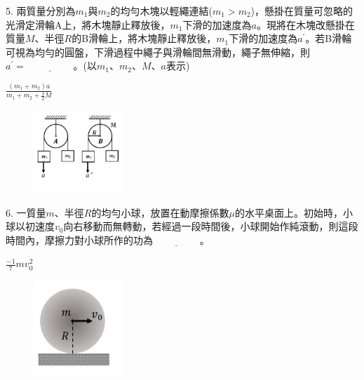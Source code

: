 \documentclass[cn,10pt,math=newtx]{elegantbook}
\begin{document}
\begin{example}
   5. 兩質量分別為$m_1與m_2$的均勻木塊以輕繩連結($m_1>m_2$)，懸掛在質量可忽略的光滑定滑輪A上，將木塊靜止釋放後，$m_1$下滑的加速度為$a$。現將在木塊改懸掛在質量$M$、半徑$R$的B滑輪上，將木塊靜止釋放後，$m_1$下滑的加速度為$a^{'}$。若B滑輪可視為均勻的圓盤，下滑過程中繩子與滑輪間無滑動，繩子無伸縮，則$a^{'}=\underline{\hspace{2cm}}$。(以$m_1、m_2、M、a$表示)\\
    \rightline{[桃園高中教甄109]}
\end{example}
\begin{solution}
    $\frac{(m_1+m_2) a} {m_1+m_2+ \frac{1}{2} M}$
\end{solution}
\begin{figure}[htbp]
    \flushright
    \includegraphics[width=0.3\textwidth]{image/109桃園5.png}
  \end{figure}
\newpage

\begin{example}
   6. 一質量$m$、半徑$R$的均勻小球，放置在動摩擦係數$\mu$的水平桌面上。初始時，小球以初速度$v_0$向右移動而無轉動，若經過一段時間後，小球開始作純滾動，則這段時間內，摩擦力對小球所作的功為$\underline{\hspace{2cm}}$。\\
    \rightline{[桃園高中教甄109]}
\end{example}
\begin{solution}
    $\frac{-1}{7} m v_0 ^2$
\end{solution}
\begin{figure}[htbp]
    \flushright
    \includegraphics[width=0.3\textwidth]{image/109桃園6.png}
  \end{figure}
\newpage
\end{document}
